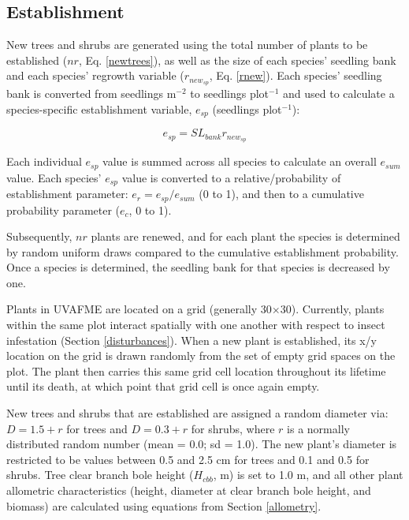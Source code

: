 \documentclass[a4paper, 12pt] {report}
\begin{document}
\subsection{Establishment} \label{treeregen}

New trees and shrubs are generated using the total number of plants to be established ($nr$, Eq. \ref{newtrees}), as well as the size of each species' seedling bank and each species' regrowth variable ($r_{new_{sp}}$, Eq. \ref{rnew}). Each species' seedling bank is converted from seedlings m$^{-2}$ to seedlings plot$^{-1}$ and used to calculate a species-specific establishment variable, $e_{sp}$ (seedlings plot$^{-1}$):

\begin{equation} 
e_{sp} = SL_{bank}r_{new_{sp}}
\end{equation}

Each individual $e_{sp}$ value is summed across all species to calculate an overall $e_{sum}$ value. Each species' $e_{sp}$ value is converted to a relative/probability of establishment parameter: $e_{r} = e_{sp}/e_{sum}$ (0 to 1), and then to a cumulative probability parameter ($e_{c}$, 0 to 1). 

Subsequently, $nr$ plants are renewed, and for each plant the species is determined by random uniform draws compared to the cumulative establishment probability. Once a species is determined, the seedling bank for that species is decreased by one. 

Plants in UVAFME are located on a grid (generally 30$\times$30). Currently, plants within the same plot interact spatially with one another with respect to insect infestation (Section \ref{disturbances}). When a new plant is established, its x/y location on the grid is drawn randomly from the set of empty grid spaces on the plot. The plant then carries this same grid cell location throughout its lifetime until its death, at which point that grid cell is once again empty.

New trees and shrubs that are established are assigned a random diameter via: $D = 1.5 + r$ for trees and $D = 0.3 + r$ for shrubs, where $r$ is a normally distributed random number (mean = 0.0; sd = 1.0). The new plant's diameter is restricted to be values between 0.5 and 2.5 cm for trees and 0.1 and 0.5 for shrubs. Tree clear branch bole height ($H_{cbb}$, m) is set to 1.0 m, and all other plant allometric characteristics (height, diameter at clear branch bole height, and biomass) are calculated using equations from Section \ref{allometry}.
\end{document}

